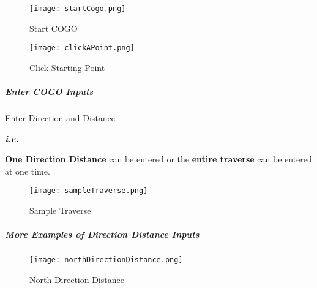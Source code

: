 \begin{figure}[h!]
\centering
    \texttt{[image: startCogo.png]}

\caption{Start COGO}
\end{figure}
%

\clearpage



\begin{figure}[h!]
\centering
    \texttt{[image: clickAPoint.png]}

\caption{Click Starting Point}
\end{figure}
%

\vspace{.5in}


\clearpage

\subparagraph{Enter COGO Inputs}

Enter {\btn Direction and Distance}

\vspace{.25in}

\textbf{\textit{i.e.}}

\vspace{.15in}

\vspace{.5in}

\noindent\textbf{One Direction Distance} can be entered or the \textbf{entire traverse} can be entered at one time.

\begin{figure}[h!]
\centering
    \texttt{[image: sampleTraverse.png]}

\caption{Sample Traverse}
\end{figure}


\clearpage

\subparagraph{More Examples of Direction Distance Inputs}


\begin{figure}[h!]
\centering
    \texttt{[image: northDirectionDistance.png]}

\caption{North Direction Distance}
\end{figure}

